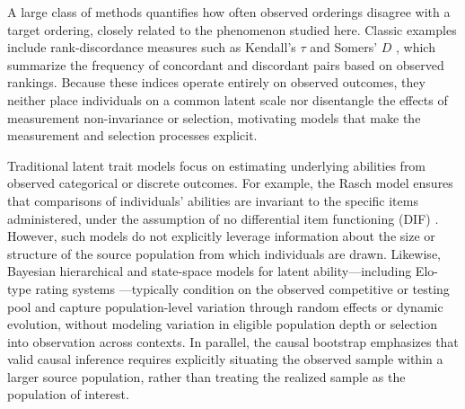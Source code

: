 \documentclass[12pt]{article}
\begin{document}
A large class of methods quantifies how often observed orderings disagree with a target ordering, closely related to the phenomenon studied here. Classic examples include rank-discordance measures such as Kendall's $\tau$ \citep{kendall1938new} and Somers' $D$ \citep{somers1962new}, which summarize the frequency of concordant and discordant pairs based on observed rankings. Because these indices operate entirely on observed outcomes, they neither place individuals on a common latent scale nor disentangle the effects of measurement non-invariance or selection, motivating models that make the measurement and selection processes explicit.

Traditional latent trait models \citep{bartholomew2011latent} focus on estimating underlying abilities from observed categorical or discrete outcomes. For example, the Rasch model \citep{bond2013applying} ensures that comparisons of individuals' abilities are invariant to the specific items administered, under the assumption of no differential item functioning (DIF) \citep{holland2012differential}. However, such models do not explicitly leverage information about the size or structure of the source population from which individuals are drawn. Likewise, Bayesian hierarchical and state-space models for latent ability---including Elo-type rating systems \citep{BRL99, elo1978rating, graepel2007bayesian}---typically condition on the observed competitive or testing pool and capture population-level variation through random effects or dynamic evolution, without modeling variation in eligible population depth or selection into observation across contexts. In parallel, the causal bootstrap \citep{imbens2018causal} emphasizes that valid causal inference requires explicitly situating the observed sample within a larger source population, rather than treating the realized sample as the population of interest.
\end{document}
